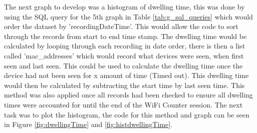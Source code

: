 \documentclass{report}
\begin{document}
The next graph to develop was a histogram of dwelling time, this was done by using the SQL query for the 5th graph in Table \ref{tab:g_sql_queries} which would order the dataset by 'recordingDateTime'. This would allow the code to sort through the records from start to end time stamp. The dwelling time would be calculated by looping through each recording in date order, there is then a list called 'mac\_addresses' which would record what devices were seen, when first seen and last seen. This could be used to calculate the dwelling time once the device had not been seen for x amount of time (Timed out). This dwelling time would then be calculated by subtracting the start time by last seen time. This method was also applied once all records had been checked to ensure all dwelling times were accounted for until the end of the WiFi Counter session. The next task was to plot the histogram, the code for this method and graph can be seen in Figure \ref{fig:dwellingTime} and \ref{fig:histdwellingTime}.\\ \newline
\end{document}
